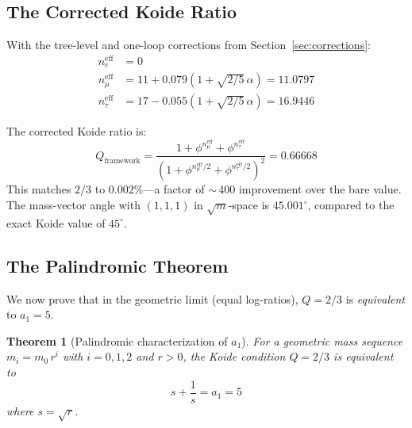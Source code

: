 \documentclass[12pt,a4paper]{article}
\newtheorem{theorem}{Theorem}
\theoremstyle{definition}
\begin{document}
\subsection{The Corrected Koide Ratio}

With the tree-level and one-loop corrections from Section~\ref{sec:corrections}:
\begin{align}
n_e^{\mathrm{eff}} &= 0 \\
n_\mu^{\mathrm{eff}} &= 11 + 0.079(1 + \sqrt{2/5}\,\alpha) = 11.0797 \\
n_\tau^{\mathrm{eff}} &= 17 - 0.055(1 + \sqrt{2/5}\,\alpha) = 16.9446
\end{align}

The corrected Koide ratio is:
\begin{equation}
\boxed{Q_{\mathrm{framework}} = \frac{1 + \phi^{n_\mu^{\mathrm{eff}}} + \phi^{n_\tau^{\mathrm{eff}}}}{(1 + \phi^{n_\mu^{\mathrm{eff}}/2} + \phi^{n_\tau^{\mathrm{eff}}/2})^2} = 0.66668}
\label{eq:Q_framework}
\end{equation}
This matches $2/3$ to $0.002\%$---a factor of ${\sim}\,400$ improvement over the bare value.  The mass-vector angle with $(1,1,1)$ in $\sqrt{m}$-space is $45.001^\circ$, compared to the exact Koide value of $45^\circ$.

\subsection{The Palindromic Theorem}
\label{sec:palindromic}

We now prove that in the geometric limit (equal log-ratios), $Q = 2/3$ is \emph{equivalent} to $a_1 = 5$.

\begin{theorem}[Palindromic characterization of $a_1$]
\label{thm:palindromic}
For a geometric mass sequence $m_i = m_0\,r^i$ with $i = 0, 1, 2$ and $r > 0$, the Koide condition $Q = 2/3$ is equivalent to
\begin{equation}
s + \frac{1}{s} = a_1 = 5
\end{equation}
where $s = \sqrt{r}$.
\end{theorem}
\end{document}
